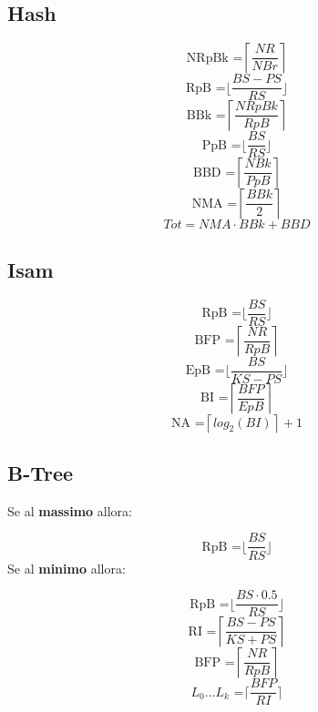 \documentclass{article}
\begin{document}
\subsection{Hash}
\[ \text{NRpBk =} \left\lceil \frac{NR}{NBr} \right\rceil\]
\[ \text{RpB =} \biggl\lfloor \frac{BS-PS}{RS} \biggr\rfloor\]
\[ \text{BBk =} \left\lceil \frac{NRpBk}{RpB} \right\rceil\]
\[ \text{PpB =} \biggl\lfloor \frac{BS}{RS} \biggr\rfloor\]
\[ \text{BBD =} \left\lceil \frac{NBk}{PpB} \right\rceil\]
\[ \text{NMA =} \left\lceil \frac{BBk}{2} \right\rceil\]
\[Tot = NMA \cdot BBk + BBD \]

\subsection{Isam}
\[ \text{RpB =} \biggl\lfloor \frac{BS}{RS} \biggr\rfloor\]
\[ \text{BFP =} \left\lceil \frac{NR}{RpB} \right\rceil\]
\[ \text{EpB =} \biggl\lfloor \frac{BS}{KS - PS} \biggr\rfloor\]
\[ \text{BI =} \left\lceil \frac{BFP}{EpB} \right\rceil\]
\[ \text{NA =} \left\lceil log_2(BI) \right\rceil +1 \]

\subsection{B-Tree}
Se al \textbf{massimo} allora:\par
\[ \text{RpB =} \biggl\lfloor \frac{BS}{RS} \biggr\rfloor\]
Se al \textbf{minimo} allora:\par
\[ \text{RpB =} \biggl\lfloor \frac{BS \cdot 0.5}{RS} \biggr\rfloor\]
\[ \text{RI =} \left\lceil \frac{BS - PS}{KS + PS} \right\rceil\]
\[ \text{BFP =} \left\lceil \frac{NR}{RpB} \right\rceil\]
\[ \text{$L_0 \dots L_k$ =} \biggl\lceil \frac{BFP}{RI} \biggr\rceil\]








\end{document}
